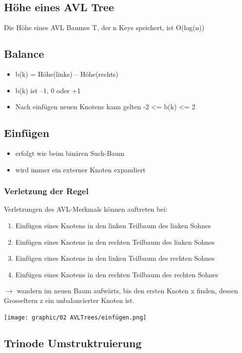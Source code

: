 \subsection{Höhe eines AVL Tree}
Die Höhe eines AVL Baumes T, der n Keys speichert, ist O(log(n))

\subsection{Balance}
\begin{itemize}
    \item b(k) = Höhe(links) – Höhe(rechts)
    \item b(k) ist –1, 0 oder +1
    \item Nach einfügen neuen Knotens kann gelten -2 <= b(k) <= 2
\end{itemize}


\subsection{Einfügen}
\begin{itemize}
    \item erfolgt wie beim binären Such-Baum
    \item wird immer ein externer Knoten expandiert
\end{itemize}
\subsubsection{Verletzung der Regel}
Verletzungen des AVL-Merkmals können auftreten bei:
\begin{enumerate}
    \item Einfügen eines Knotens in den linken Teilbaum des linken Sohnes
    \item Einfügen eines Knotens in den rechten Teilbaum des linken Sohnes
    \item Einfügen eines Knotens in den linken Teilbaum des rechten Sohnes
    \item Einfügen eines Knotens in den rechten Teilbaum des rechten Sohnes
\end{enumerate}
$\rightarrow$ wandern im neuen Baum aufwärts, bis den ersten Knoten x finden, dessen Grosseltern z ein unbalancierter Knoten ist.
\begin{center}
    \texttt{[image: graphic/02 AVLTrees/einfügen.png]}
\end{center}


\subsection{Trinode Umstruktruierung}
